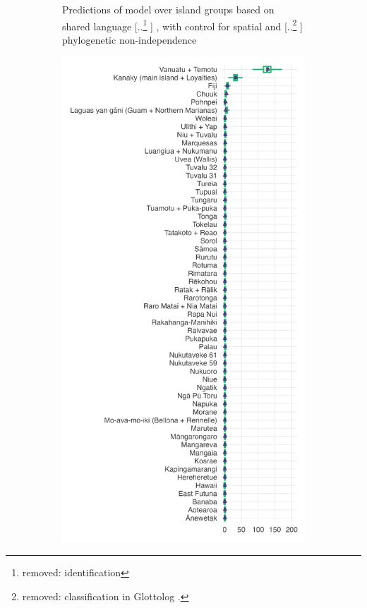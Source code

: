 \documentclass[unnumsec,webpdf,modern,medium]{oup-authoring-template}
\providecommand{\DIFaddtex}[1]{{\protect\color{blue} \sf #1}} %
\providecommand{\DIFdeltex}[1]{{\protect\color{red} [..\footnote{removed: #1} ]}} %
\providecommand{\DIFaddFL}[1]{\DIFadd{#1}} %
\providecommand{\DIFdelFL}[1]{\DIFdel{#1}} %
\providecommand{\DIFaddbeginFL}{} %
\providecommand{\DIFaddendFL}{} %
\providecommand{\DIFdelbeginFL}{} %
\providecommand{\DIFdelendFL}{} %
\providecommand{\DIFadd}[1]{\texorpdfstring{\DIFaddtex{#1}}{#1}} %
\providecommand{\DIFdel}[1]{\texorpdfstring{\DIFdeltex{#1}}{}} %
\newcommand{\DIFscaledelfig}{0.5}
\newlength{\DIFdelgraphicswidth} %
\newlength{\DIFdelgraphicsheight} %
\newcommand{\DIFaddincludegraphics}[2][]{{\color{blue}\fbox{\DIFOincludegraphics[#1]{#2}}}} %
\newcommand{\DIFdelincludegraphics}[2][]{%
\sbox{\DIFdelgraphicsbox}{\DIFOincludegraphics[#1]{#2}}%
\settoboxwidth{\DIFdelgraphicswidth}{\DIFdelgraphicsbox} %
\settoboxtotalheight{\DIFdelgraphicsheight}{\DIFdelgraphicsbox} %
\scalebox{\DIFscaledelfig}{%
\parbox[b]{\DIFdelgraphicswidth}{\usebox{\DIFdelgraphicsbox}\\[-\baselineskip] \rule{\DIFdelgraphicswidth}{0em}}\llap{\resizebox{\DIFdelgraphicswidth}{\DIFdelgraphicsheight}{%
\setlength{\unitlength}{\DIFdelgraphicswidth}%
\begin{picture}(1,1)%
\thicklines\linethickness{2pt} %
{\color[rgb]{1,0,0}\put(0,0){\framebox(1,1){}}}%
{\color[rgb]{1,0,0}\put(0,0){\line( 1,1){1}}}%
{\color[rgb]{1,0,0}\put(0,1){\line(1,-1){1}}}%
\end{picture}%
}\hspace*{3pt}}} %
} %
\DeclareRobustCommand{\DIFaddbeginFL}{\DIFOaddbeginFL \let\includegraphics\DIFaddincludegraphics} %
\DeclareRobustCommand{\DIFaddendFL}{\DIFOaddendFL \let\includegraphics\DIFOincludegraphics} %
\DeclareRobustCommand{\DIFdelbeginFL}{\DIFOdelbeginFL \let\includegraphics\DIFdelincludegraphics} %
\DeclareRobustCommand{\DIFdelendFL}{\DIFOaddendFL \let\includegraphics\DIFOincludegraphics} %
\begin{document}
\begin{figure}
\begin{subfigure}{0.48\textwidth}
\caption{\DIFaddFL{Predictions of model over island groups based on shared }\DIFaddendFL language\DIFdelbeginFL \DIFdelFL{identification }\DIFdelendFL \DIFaddbeginFL \DIFaddFL{, with control for spatial }\DIFaddendFL and \DIFdelbeginFL \DIFdelFL{classification in Glottolog \citep{glottologlanguoids}.}%
\DIFdelendFL \DIFaddbeginFL \DIFaddFL{phylogenetic non-independence}\DIFaddendFL }
\DIFdelbeginFL %
\DIFdelendFL \DIFaddbeginFL \label{medium_model_predict}
\end{subfigure}%
\hfill
\begin{subfigure}{0.48\textwidth}
  \centering
  \includegraphics[width=1\textwidth]{latex/brms_predict_SBZR_control_phylo.png}

\end{subfigure}
\end{figure}
\end{document}
